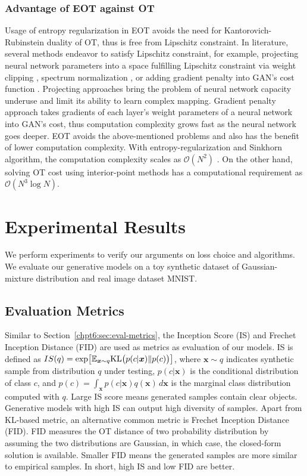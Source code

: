 \subsubsection{Advantage of EOT against OT}

Usage of entropy regularization in EOT avoids the need for Kantorovich-Rubinstein duality
of OT, thus is free from Lipschitz constraint. In literature, several methods endeavor to
satisfy Lipschitz constraint, for example, projecting neural network
parameters into a space fulfilling Lipschitz constraint via weight
clipping \cite{2017arXiv170107875A}, spectrum
normalization \cite{2018arXiv180205957M}, or adding gradient 
penalty into GAN's cost function \cite{2017arXiv170400028G}. Projecting
approaches bring the problem of neural network capacity underuse and
limit its ability to learn complex mapping. Gradient penalty approach takes
gradients of each layer's weight parameters of a neural network into
GAN's cost, thus computation complexity grows fast as the neural
network goes deeper. 
EOT avoids the above-mentioned problems and also has the benefit of lower
computation complexity. With entropy-regularization and Sinkhorn
algorithm, the computation complexity scales as $\mathcal{O}(N^2)$ \cite{2013arXiv1306.0895C}. 
On the other hand, solving OT cost using interior-point methods has a computational requirement as 
$\mathcal{O}(N^3\log{N})$. 


\section{Experimental Results}
We perform experiments to verify our arguments on loss choice and algorithms. We evaluate our
generative models on a toy synthetic dataset of Gaussian-mixture distribution and real image dataset MNIST.

\subsection{Evaluation Metrics}\label{subsec-metric}
Similar to Section~\ref{chpt6:sec:eval-metrics}, the Inception Score (IS) \cite{NIPS2016_6125} and Frechet Inception Distance (FID)\cite{2017arXiv170608500H} are used as metrics as evaluation of our models. IS is defined as $
  IS(q) = \exp\bigl[ \mathbb{E}_{\bm{x} \sim q} \mathrm{KL}\bigl( p(c | \bm{x})\| p(c) \bigr)  \bigr]$,
where $\bm{x}\sim q$ indicates synthetic sample from distribution $q$ under testing, $p(c|\bm{x})$ is the conditional distribution of class $c$, and $p(c) = \int_{\bm{x}}p(c|\bm{x})q(\bm{x}) \,d \bm{x} $ is the marginal class distribution computed with $q$. Large IS score means generated samples contain clear objects. Generative models with high IS can output high diversity of samples. Apart from KL-based metric, an alternative common metric is Frechet Inception Distance (FID)\cite{2017arXiv170608500H}. FID measures the OT distance of two probability distribution by assuming the two distributions are Gaussian, in which case, the closed-form solution is available. Smaller FID means the generated samples are more similar to empirical samples. In short, high IS and low FID are better.


